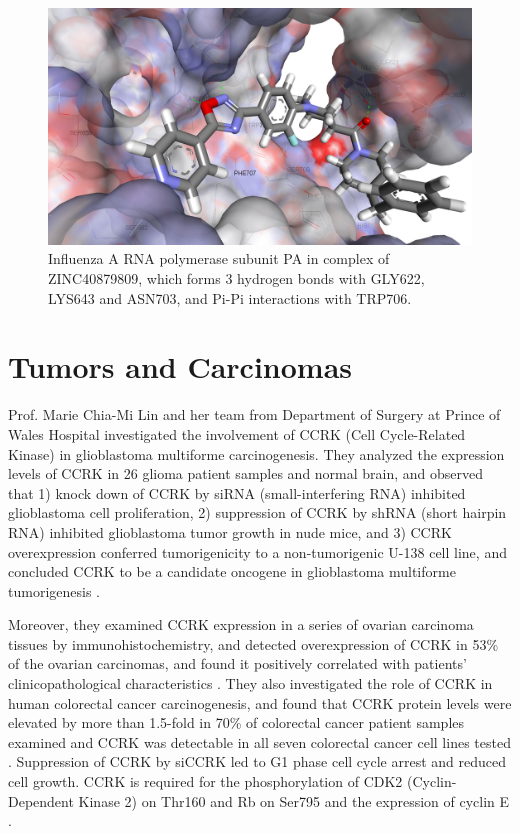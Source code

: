 \begin{figure}
\centering
\includegraphics[width=\linewidth]{Case/2ZNL-ZINC40879809.png}
\caption{Influenza A RNA polymerase subunit PA in complex of ZINC40879809, which forms 3 hydrogen bonds with GLY622, LYS643 and ASN703, and Pi-Pi interactions with TRP706.}
\label{Case:2ZNL-ZINC40879809}
\end{figure}

\section{Tumors and Carcinomas}

Prof. Marie Chia-Mi Lin and her team from Department of Surgery at Prince of Wales Hospital investigated the involvement of CCRK (Cell Cycle-Related Kinase) in glioblastoma multiforme carcinogenesis. They analyzed the expression levels of CCRK in 26 glioma patient samples and normal brain, and observed that 1) knock down of CCRK by siRNA (small-interfering RNA) inhibited glioblastoma cell proliferation, 2) suppression of CCRK by shRNA (short hairpin RNA) inhibited glioblastoma tumor growth in nude mice, and 3) CCRK overexpression conferred tumorigenicity to a non-tumorigenic U-138 cell line, and concluded CCRK to be a candidate oncogene in glioblastoma multiforme tumorigenesis \citep{1144}.

Moreover, they examined CCRK expression in a series of ovarian carcinoma tissues by immunohistochemistry, and detected overexpression of CCRK in 53\% of the ovarian carcinomas, and found it positively correlated with patients' clinicopathological characteristics \citep{1145}. They also investigated the role of CCRK in human colorectal cancer carcinogenesis, and found that CCRK protein levels were elevated by more than 1.5-fold in 70\% of colorectal cancer patient samples examined and CCRK was detectable in all seven colorectal cancer cell lines tested \citep{1143}. Suppression of CCRK by siCCRK led to G1 phase cell cycle arrest and reduced cell growth. CCRK is required for the phosphorylation of CDK2 (Cyclin-Dependent Kinase 2) on Thr160 and Rb on Ser795 and the expression of cyclin E \citep{1143}. 

